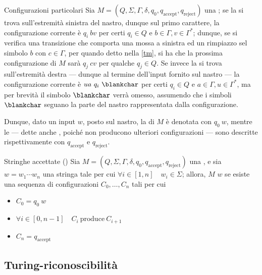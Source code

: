\documentclass[a4paper, 12pt]{report}
\begin{document}
    \begin{framedobs}{Configurazioni particolari}
        Sia $M = (Q, \Sigma, \Gamma, \delta, q_0, q_\mathrm{accept}, q_\mathrm{reject})$ una \TM; se la \TM si trova sull'estremità sinistra del nastro, dunque sul primo carattere, la configurazione corrente è $q_i \ bv$ per certi $q_i \in Q$ e $b \in \Gamma, v \in \Gamma^*$; dunque, se si verifica una transizione che comporta una mossa a sinistra ed un rimpiazzo sel simbolo $b$ con $c \in \Gamma$, per quando detto nella \cref{tm}, si ha che la prossima configurazione di $M$ sarà $q_j \ cv$ per qualche $q_j \in Q$. Se invece la \TM si trova sull'estremità destra --- dunque al termine dell'input fornito sul nastro --- la configurazione corrente è $ua \ q_i \ \blankchar$ per certi $q_i \in Q$ e $a \in \Gamma, u \in \Gamma^*$, ma per brevità il simbolo $\blankchar$ verrà omesso, assumendo che i simboli $\blankchar$ seguano la parte del nastro rappresentata dalla configurazione.

        Dunque, dato un input $w$, posto sul nastro, la  di $M$ è denotata con $q_0 \ w$, mentre le  --- dette anche , poiché non producono ulteriori configurazioni --- sono descritte rispettivamente con $q_\mathrm{accept}$ e $q_\mathrm{reject}$.
    \end{framedobs}

    \begin{frameddefn}{Stringhe accettate (\TM)}
        Sia $M = (Q, \Sigma, \Gamma, \delta, q_0, q_\mathrm{accept}, q_\mathrm{reject})$ una \TM, e sia $w = w_1 \cdots w_n$ una stringa tale per cui $\forall i \in [1, n] \quad w_i \in \Sigma$; allora, $M$  $w$ se esiste una sequenza di configurazioni $C_0, \ldots, C_n$ tali per cui

        \begin{itemize}
            \item $C_0 = q_0 \ w$
            \item $\forall i \in [0, n - 1] \quad C_i \ \mathrm{produce} \ C_{i + 1}$
            \item $C_n = q_\mathrm{accept}$
        \end{itemize}
    \end{frameddefn}

    \subsection{Turing-riconoscibilità}
\end{document}

